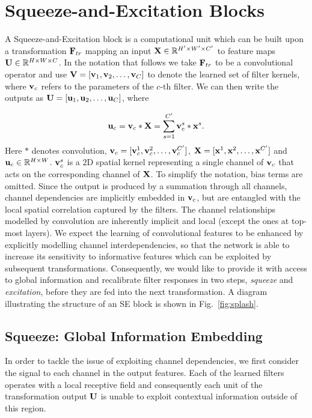 \section{Squeeze-and-Excitation Blocks\label{sec:se-blocks}}

A Squeeze-and-Excitation block is a computational
unit which can be built upon a transformation $\mathbf{F}_{tr}$ mapping an input $\mathbf{X} \in \mathbb{R}^{H' \times W' \times C'}$ to feature maps $\mathbf{U} \in \mathbb{R}^{H \times W \times C}$.  In the notation that follows we take $\mathbf{F}_{tr}$ to be a convolutional operator and use $\mathbf{V}= [\mathbf{v}_1, \mathbf{v}_2, \dots, \mathbf{v}_{C}]$ to denote the learned set of filter kernels, where $\mathbf{v}_c$ refers to the parameters of the \mbox{$c$-th} filter.  We can then write the outputs as $\mathbf{U} = [\mathbf{u}_1, \mathbf{u}_2, \dots, \mathbf{u}_{C}]$, where

\begin{equation}\label{simple_neuron}
\mathbf{u}_c = \mathbf{v}_c \ast \mathbf{X} = \sum_{s=1}^{C'}\mathbf{v}^s_c \ast \mathbf{x}^s.
\end{equation}
Here $\ast$ denotes convolution, $\mathbf{v}_c = [\mathbf{v}^1_c, \mathbf{v}^2_c, \dots, \mathbf{v}^{C'}_c]$, $\mathbf{X} = [\mathbf{x}^1, \mathbf{x}^2, \dots, \mathbf{x}^{C'}]$ and \mbox{$\mathbf{u}_c \in \mathbb{R}^{H \times W}$}. $\mathbf{v}^s_c$ is a $2$D spatial kernel representing a single channel of $\mathbf{v}_c$ that acts on the corresponding channel of $\mathbf{X}$. To simplify the notation, bias terms are omitted. Since the output is produced by a summation through all channels, channel dependencies are implicitly embedded in $\mathbf{v}_c$, but are entangled with the local spatial correlation captured by the filters.  The channel relationships modelled by convolution are inherently implicit and local (except the ones at top-most layers). We expect the learning of convolutional features to be enhanced by explicitly modelling channel interdependencies, so that the network is able to increase its sensitivity to informative features which can be exploited by subsequent transformations. Consequently, we would like to provide it with access to global information and recalibrate filter responses in two steps, \textit{squeeze} and \textit{excitation}, before they are fed into the next transformation. A diagram illustrating the structure of an SE block is shown in Fig.~\ref{fig:splash}.


\subsection{Squeeze: Global Information Embedding}
In order to tackle the issue of exploiting channel dependencies, we first consider the signal to each channel in the output features.  Each of the learned filters operates with a local receptive field and consequently each unit of the transformation output $\mathbf{U}$ is unable to exploit contextual information outside of this region.

